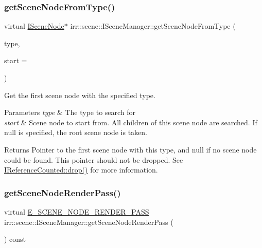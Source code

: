 \subsubsection{\texorpdfstring{get\+Scene\+Node\+From\+Type()}{getSceneNodeFromType()}\hspace{0.1cm}{\footnotesize\ttfamily [2/2]}}
{\footnotesize\ttfamily virtual \hyperlink{classirr_1_1scene_1_1ISceneNode}{I\+Scene\+Node}$\ast$ irr\+::scene\+::\+I\+Scene\+Manager\+::get\+Scene\+Node\+From\+Type (\begin{DoxyParamCaption}\item[{\hyperlink{namespaceirr_1_1scene_acad3d7ef92a9807d391ba29120f3b7bd}{scene\+::\+E\+S\+C\+E\+N\+E\+\_\+\+N\+O\+D\+E\+\_\+\+T\+Y\+PE}}]{type,  }\item[{\hyperlink{classirr_1_1scene_1_1ISceneNode}{I\+Scene\+Node} $\ast$}]{start = {} }\end{DoxyParamCaption})\hspace{0.3cm}{\ttfamily [pure virtual]}}



Get the first scene node with the specified type. 


\begin{DoxyParams}{Parameters}
{\em type} & The type to search for \\
\hline
{\em start} & Scene node to start from. All children of this scene node are searched. If null is specified, the root scene node is taken. \\
\hline
\end{DoxyParams}
\begin{DoxyReturn}{Returns}
Pointer to the first scene node with this type, and null if no scene node could be found. This pointer should not be dropped. See \hyperlink{classirr_1_1IReferenceCounted_a03856a09355b89d178090c4a5f738543}{I\+Reference\+Counted\+::drop()} for more information. 
\end{DoxyReturn}
\mbox{\label{classirr_1_1scene_1_1ISceneManager_a2b8f844a1367d80648bc055a5639807b}} 
\subsubsection{\texorpdfstring{get\+Scene\+Node\+Render\+Pass()}{getSceneNodeRenderPass()}\hspace{0.1cm}{\footnotesize\ttfamily [1/2]}}
{\footnotesize\ttfamily virtual \hyperlink{namespaceirr_1_1scene_a7862269bd1abc123929d4dbb8200d67f}{E\+\_\+\+S\+C\+E\+N\+E\+\_\+\+N\+O\+D\+E\+\_\+\+R\+E\+N\+D\+E\+R\+\_\+\+P\+A\+SS} irr\+::scene\+::\+I\+Scene\+Manager\+::get\+Scene\+Node\+Render\+Pass (\begin{DoxyParamCaption}{ }\end{DoxyParamCaption}) const\hspace{0.3cm}{\ttfamily [pure virtual]}}



